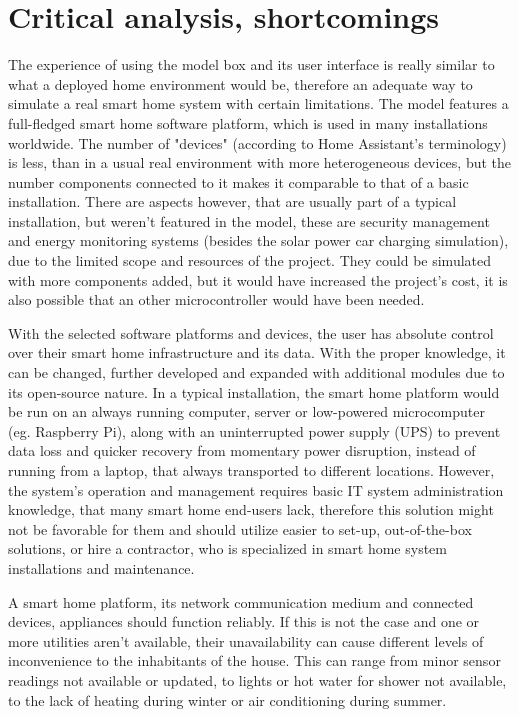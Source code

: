 \section{Critical analysis, shortcomings}

The experience of using the model box and its user interface is really similar to what a deployed home environment would be, therefore an adequate way to simulate a real smart home system with certain limitations. The model features a full-fledged smart home software platform, which is used in many installations worldwide.
The number of "devices" (according to Home Assistant's terminology) is less, than in a usual real environment with more heterogeneous devices, but the number components connected to it makes it comparable to that of a basic installation.
There are aspects however, that are usually part of a typical installation, but weren't featured in the model, these are security management and energy monitoring systems (besides the solar power car charging simulation), due to the limited scope and resources of the project. They could be simulated with more components added, but it would have increased the project's cost, it is also possible that an other microcontroller would have been needed.

With the selected software platforms and devices, the user has absolute control over their smart home infrastructure and its data. With the proper knowledge, it can be changed, further developed and expanded with additional modules due to its open-source nature. In a typical installation, the smart home platform would be run on an always running computer, server or low-powered microcomputer (eg. Raspberry Pi), along with an uninterrupted power supply (UPS) to prevent data loss and quicker recovery from momentary power disruption, instead of running from a laptop, that always transported to different locations. However, the system's operation and management requires basic IT system administration knowledge, that many smart home end-users lack, therefore this solution might not be favorable for them and should utilize easier to set-up, out-of-the-box solutions, or hire a contractor, who is specialized in smart home system installations and maintenance.

A smart home platform, its network communication medium and connected devices, appliances should function reliably. If this is not the case and one or more utilities aren't available, their unavailability can cause different levels of inconvenience to the inhabitants of the house. This can range from minor sensor readings not available or updated, to lights or hot water for shower not available, to the lack of heating during winter or air conditioning during summer.

